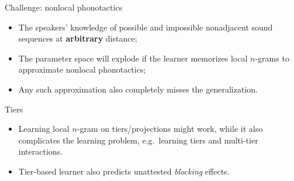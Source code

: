 \begin{frame}{Challenge: nonlocal phonotactics}
\begin{itemize}
\item The speakers' knowledge of possible and impossible nonadjacent sound sequences at \textbf{arbitrary} distance;

 \item The parameter space will explode if the learner memorizes local $n$-grams to approximate nonlocal phonotactics;
  \\
 \hfill\small\citep{hayes2008maximum,gouskova2019inducing}
\item Any such approximation also completely misses the generalization. 
 \\
 \hfill\small\citep{heinz2010maximum}
\end{itemize}
\end{frame}

\begin{frame}{Tiers}

\begin{center}
\end{center}

\begin{itemize}
    \item Learning local $n$-gram on tiers/projections might work, while it also complicates the learning problem, e.g.\ learning tiers and multi-tier interactions.
    \hfill \small \citep{hayes2008maximum,gouskova2019inducing}
\normalsize
    \item Tier-based learner also predicts unattested \textit{blocking} effects.
    
    \hfill \small \citep{heinz2010learning,rose2004typology,hansson2010consonant}

\end{itemize}
\end{frame}

